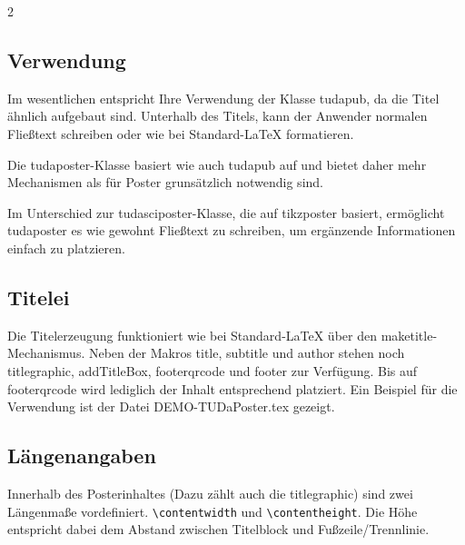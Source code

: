 \documentclass[
	paper=a0,
	ngerman,
	accentcolor=9c,
	logo=body,%
	footer=true,
	]{tudaposter}
\begin{document}
\begin{multicols}{2}
\subsection*{Verwendung}
Im wesentlichen entspricht Ihre Verwendung der Klasse tudapub, da die Titel ähnlich aufgebaut sind. Unterhalb des Titels, kann der Anwender normalen Fließtext schreiben oder wie bei Standard-\LaTeX{} formatieren.

Die tudaposter-Klasse basiert wie auch tudapub auf \KOMAScript{} und bietet daher mehr Mechanismen als für Poster grunsätzlich notwendig sind.

Im Unterschied zur tudasciposter-Klasse, die auf tikzposter basiert, ermöglicht tudaposter es wie gewohnt Fließtext zu schreiben, um ergänzende Informationen einfach zu platzieren.

\subsection*{Titelei}
Die Titelerzeugung funktioniert wie bei Standard-\LaTeX{} über den maketitle-Mechanismus. Neben der Makros title, subtitle und author stehen noch
titlegraphic, addTitleBox, footerqrcode und footer zur Verfügung. Bis auf footerqrcode wird lediglich der Inhalt entsprechend platziert. Ein Beispiel für die Verwendung ist der Datei DEMO-TUDaPoster.tex gezeigt.

\subsection*{Längenangaben}
Innerhalb des Posterinhaltes (Dazu zählt auch die titlegraphic) sind zwei Längenmaße vordefiniert.
\texttt{\textbackslash{}contentwidth} und \texttt{\textbackslash{}contentheight}. Die Höhe entspricht dabei dem Abstand zwischen Titelblock und Fußzeile/Trennlinie.


\end{multicols}
\end{document}
